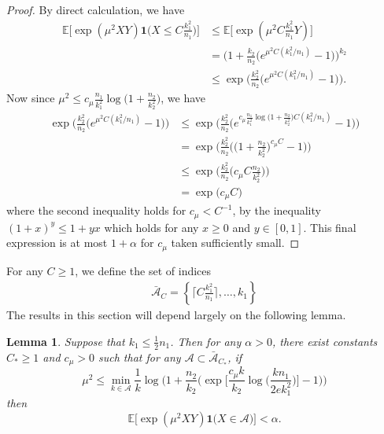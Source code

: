 \documentclass{article}
\newcommand{\cA}{\mathcal{A}}
\newcommand{\EE}{\mathbb{E}}
\newcommand{\one}{\mathbf{1}}
\newcommand{\Ct}{C_{*}}
\newtheorem{lemma}{Lemma}
\begin{document}
\begin{proof}
   By direct calculation, we have
    \begin{align*}
        \EE\Big[\exp(\mu^2XY)\one\big(X \leq C \frac{k_1^2}{n_1}\big)\Big] &\leq \EE\Big[\exp(\mu^2C \frac{k_1^2}{n_1}Y)\Big] \\ 
        &= \Big(1 + \frac{k_2}{n_2}\big(e^{\mu^2C (k_1^2/n_1)} - 1\big)\Big)^{k_2} \\ 
        &\leq \exp\Big(\frac{k_2^2}{n_2}\big(e^{\mu^2C (k_1^2/n_1)} - 1\big)\Big).
    \end{align*}
    Now since $\mu^2 \leq c_{\mu}\frac{n_1}{k_1^2}\log\big(1 + \frac{n_2}{k_2^2}\big)$, we have 
    \begin{align*}
        \exp\Big(\frac{k_2^2}{n_2}\big(e^{\mu^2C (k_1^2/n_1)} - 1\big)\Big) &\leq \exp\Big(\frac{k_2^2}{n_2}\big(e^{c_{\mu}\frac{n_1}{k_1^2}\log\big(1 + \frac{n_2}{k_2^2}\big)C (k_1^2/n_1)} - 1\big)\Big) \\ 
        &= \exp\Big(\frac{k_2^2}{n_2}\big(\big(1 + \frac{n_2}{k_2^2}\big)^{c_{\mu}C} - 1\big)\Big) \\ 
        &\leq \exp\Big(\frac{k_2^2}{n_2}\big(c_{\mu}C\frac{n_2}{k_2^2}\big)\Big) \\
        &= \exp\big(c_\mu C\big)
    \end{align*}
    where the second inequality holds for $c_\mu < C^{-1}$, by the inequality $(1+x)^y \leq 1+y x$ which holds for any $x\geq 0$ and $y \in [0,1]$. This final expression is at most $1 + \alpha$ for $c_\mu$ taken sufficiently small.
\end{proof}

For any $C \geq 1$, we define the set of indices
\begin{align}
    \bar{\cA}_C = \left\{ \Big\lceil C\frac{k_1^2}{n_1}\Big\rceil, \dots , k_1\right\}\label{eq_def_A_C}
\end{align}
The results in this section will depend largely on the following lemma.

\begin{lemma}\label{lemma:geom-series}
    Suppose that $k_1 \leq \frac12n_1$. Then for any $\alpha > 0$, there exist constants $\Ct \geq 1$ and $c_\mu > 0$ such that for any $\cA \subset \bar{\cA}_{\Ct}$, if
    \[\mu^2 \leq \min_{k \in \cA}\frac{1}{k}\log\Bigg(1 + \frac{n_2}{k_2}\bigg(\exp\Big[\frac{c_\mu k}{k_2}\log\big(\frac{kn_1}{2ek_1^2}\big)\Big] - 1\bigg)\Bigg)\]
    then 
    \[\EE\Big[\exp(\mu^2XY)\one\Big(X \in \cA \Big)\Big] < \alpha.\]

\end{lemma}
\end{document}
